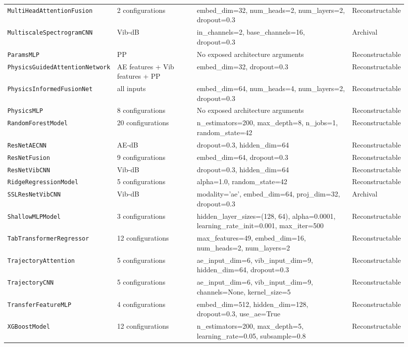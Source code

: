 \begin{longtable}{@{}p{0.23\linewidth}p{0.20\linewidth}p{0.39\linewidth}p{0.12\linewidth}@{}}
\texttt{MultiHeadAttentionFusion} & 2 configurations & embed\_dim=32, num\_heads=2, num\_layers=2, dropout=0.3 & Reconstructable \\
\texttt{MultiscaleSpectrogramCNN} & Vib-dB & in\_channels=2, base\_channels=16, dropout=0.3 & Archival \\
\texttt{ParamsMLP} & PP & No exposed architecture arguments & Reconstructable \\
\texttt{PhysicsGuidedAttentionNetwork} & AE features + Vib features + PP & embed\_dim=32, dropout=0.3 & Reconstructable \\
\texttt{PhysicsInformedFusionNet} & all inputs & embed\_dim=64, num\_heads=4, num\_layers=2, dropout=0.3 & Reconstructable \\
\texttt{PhysicsMLP} & 8 configurations & No exposed architecture arguments & Reconstructable \\
\texttt{RandomForestModel} & 20 configurations & n\_estimators=200, max\_depth=8, n\_jobs=1, random\_state=42 & Reconstructable \\
\texttt{ResNetAECNN} & AE-dB & dropout=0.3, hidden\_dim=64 & Reconstructable \\
\texttt{ResNetFusion} & 9 configurations & embed\_dim=64, dropout=0.3 & Reconstructable \\
\texttt{ResNetVibCNN} & Vib-dB & dropout=0.3, hidden\_dim=64 & Reconstructable \\
\texttt{RidgeRegressionModel} & 5 configurations & alpha=1.0, random\_state=42 & Reconstructable \\
\texttt{SSLResNetVibCNN} & Vib-dB & modality='ae', embed\_dim=64, proj\_dim=32, dropout=0.3 & Archival \\
\texttt{ShallowMLPModel} & 3 configurations & hidden\_layer\_sizes=(128, 64), alpha=0.0001, learning\_rate\_init=0.001, max\_iter=500 & Reconstructable \\
\texttt{TabTransformerRegressor} & 12 configurations & max\_features=49, embed\_dim=16, num\_heads=2, num\_layers=2 & Reconstructable \\
\texttt{TrajectoryAttention} & 5 configurations & ae\_input\_dim=6, vib\_input\_dim=9, hidden\_dim=64, dropout=0.3 & Reconstructable \\
\texttt{TrajectoryCNN} & 5 configurations & ae\_input\_dim=6, vib\_input\_dim=9, channels=None, kernel\_size=5 & Reconstructable \\
\texttt{TransferFeatureMLP} & 4 configurations & embed\_dim=512, hidden\_dim=128, dropout=0.3, use\_ae=True & Reconstructable \\
\texttt{XGBoostModel} & 12 configurations & n\_estimators=200, max\_depth=5, learning\_rate=0.05, subsample=0.8 & Reconstructable \\
\bottomrule
\end{longtable}
\endgroup
